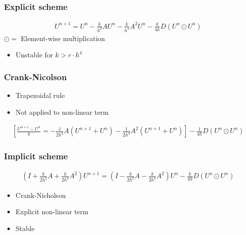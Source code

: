 \documentclass[screen]{beamer}
\begin{document}
\begin{frame}
\frametitle{Explicit scheme}
\flushright

\begin{align*}
U^{n+1} = U^n - \frac{k}{h^2}AU^n - \frac{k}{h^4}A^2U^n - \frac{k}{4h}D(U^{n}\odot U^n)
\end{align*}
$\odot =$ Element-wise multiplication
\begin{itemize}
\item Unstable for $k > r \cdot h^4$

\end{itemize}
\end{frame}


\begin{frame}
\frametitle{Crank-Nicolson}
\begin{itemize}
\normalsize
\item Trapezoidal rule
\item Not applied to non-linear term
\end{itemize}
\small
\begin{align*}
 \left[\frac{U^{n+1} - U^n}{k} =
- \frac{1}{2h^2}A(U^{n+1}+U^n) - \frac{1}{2h^4}A^2(U^{n+1}+U^n) \right] - \frac{1}{4h}D(U^{n}\odot U^n)
\end{align*}

\end{frame}


\begin{frame}
\frametitle{Implicit scheme}
\begin{align*}
(I + \frac{k}{2h^2}A + \frac{k}{2h^4}A^2)U^{n+1}
= (I - \frac{k}{2h^2}A - \frac{k}{2h^4}A^2)U^n - \frac{k}{4h}D(U^{n}\odot U^n)
\end{align*}

\begin{itemize}
\item Crank-Nicholson
\item Explicit non-linear term
\item Stable
\end{itemize}

\end{frame}
\end{document}
